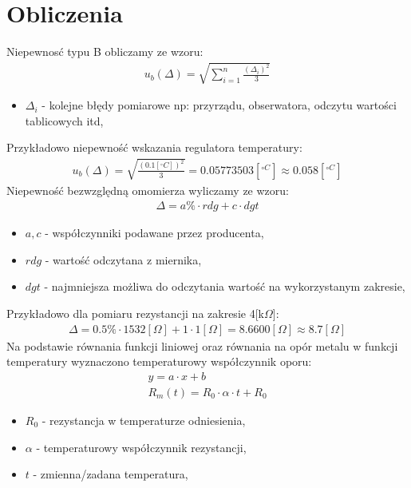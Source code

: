 \documentclass[11pt]{article}
\begin{document}
    \section{Obliczenia}
    Niepewnosć typu B obliczamy ze wzoru:
    \begin{gather*}
        u_b(\Delta)=\sqrt{\sum_{i=1}^{n}\frac{(\Delta_i)^2}{3}}
    \end{gather*}
    {\footnotesize
        \begin{itemize}
            \item[] $\Delta_i$ - kolejne błędy pomiarowe np: przyrządu, obserwatora, odczytu wartości tablicowych itd,
        \end{itemize}}
    \noindent Przykładowo niepewność wskazania regulatora temperatury:
    \begin{gather*}
        u_b(\Delta)=\sqrt{\frac{(0.1[^\circ C])^2}{3}}=0.05773503[^{\circ C}]\approx 0.058[^{\circ C}]
    \end{gather*}
    \noindent Niepewność bezwzględną omomierza wyliczamy ze wzoru:
    \begin{gather*}
        \Delta=a\%\cdot rdg+c\cdot dgt
    \end{gather*}
    {\footnotesize
        \begin{itemize}
            \item[] $a,c$ - współczynniki podawane przez producenta,
            \item[] $rdg$ - wartość odczytana z miernika,
            \item[] $dgt$ - najmniejsza możliwa do odczytania wartość na wykorzystanym zakresie,
        \end{itemize}}
    \newpage
    \noindent Przykładowo dla pomiaru rezystancji na zakresie 4[k$\Omega$]:
    \begin{gather*}
        \Delta=0.5\%\cdot 1532[\Omega] +1\cdot 1[\Omega]=8.6600[\Omega]\approx 8.7[\Omega]
    \end{gather*}
    Na podstawie równania funkcji liniowej oraz równania na opór metalu w funkcji temperatury wyznaczono temperaturowy współczynnik oporu:
    \begin{gather*}
        y=a\cdot x+b\\
        R_m(t)=R_0\cdot\alpha\cdot t+R_0
    \end{gather*}
    {\footnotesize
        \begin{itemize}
            \item[] $R_0$ - rezystancja w temperaturze odniesienia,
            \item[] $\alpha$ - temperaturowy współczynnik rezystancji,
            \item[] $t$ - zmienna/zadana temperatura,
        \end{itemize}
    }
\end{document}

